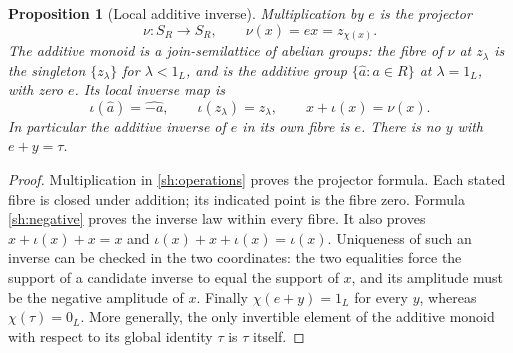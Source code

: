 \documentclass[11pt,a4paper]{article}
\newtheorem{proposition}[theorem]{Proposition}
\theoremstyle{definition}\newtheorem{definition}[theorem]{Definition}
\begin{document}
\begin{proposition}[Local additive inverse]\label{sh:addinverse}
Multiplication by $e$ is the projector
\begin{equation}\tag{SH4}\label{sh:epsilon}
 \nu:S_R\to S_R,\qquad \nu(x)=ex=z_{\chi(x)}.
\end{equation}
The additive monoid is a join-semilattice of abelian groups:
the fibre of $\nu$ at $z_\lambda$ is the singleton $\{z_\lambda\}$
for $\lambda<1_L$, and is the additive group
$\{\widehat a:a\in R\}$ at $\lambda=1_L$, with zero $e$.
Its local inverse map is
\begin{equation}\tag{SH5}\label{sh:negative}
 \iota(\widehat a)=\widehat{-a},\qquad
 \iota(z_\lambda)=z_\lambda,\qquad
 x+\iota(x)=\nu(x).
\end{equation}
In particular the additive inverse of $e$ in its own fibre is $e$.
There is no $y$ with $e+y=\tau$.
\end{proposition}
\begin{proof}
Multiplication in \eqref{sh:operations} proves the projector formula.
Each stated fibre is closed under addition; its indicated point is
the fibre zero. Formula \eqref{sh:negative} proves the inverse law
within every fibre. It also proves $x+\iota(x)+x=x$ and
$\iota(x)+x+\iota(x)=\iota(x)$. Uniqueness of such an inverse
can be checked in the two coordinates: the two equalities force
the support of a candidate inverse to equal the support of $x$,
and its amplitude must be the negative amplitude of $x$.
Finally $\chi(e+y)=1_L$ for every $y$, whereas $\chi(\tau)=0_L$.
More generally, the only invertible element of the additive monoid
with respect to its global identity $\tau$ is $\tau$ itself.
\end{proof}
\end{document}
